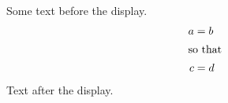 \documentclass[12pt]{article}
\begin{document}
Some text before the display.
\begin{align} a &= b \\ \intertext{so that} c &= d \end{align}
Text after the display.
\end{document}
